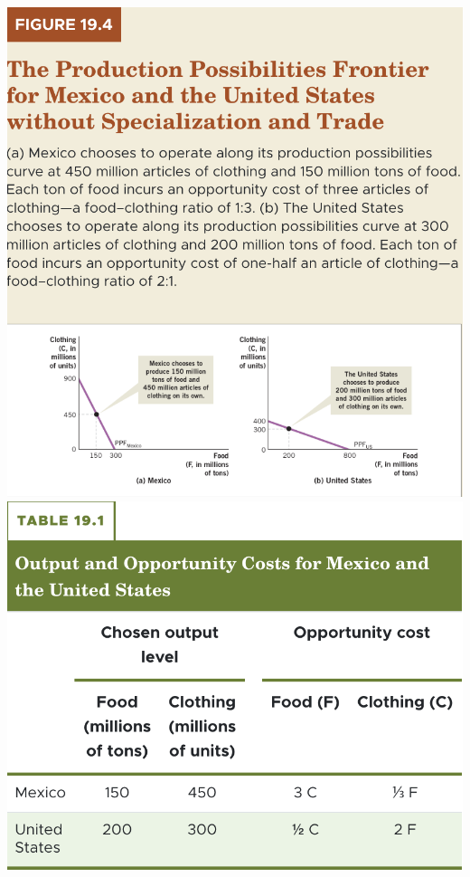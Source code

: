 \documentclass[11pt]{article} %
\begin{document}
\begin{center}
\includegraphics[scale=0.5]{images/Figure 19.4.png} \\
\includegraphics[scale=0.5]{images/Table 19.1.png} \\

\end{center}
\end{document}
